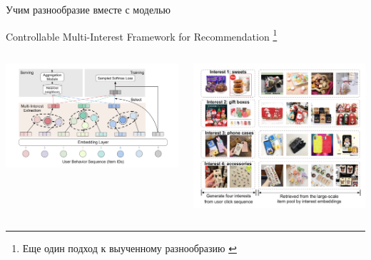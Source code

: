 \documentclass[11pt,aspectratio=169,handout]{beamer}
\begin{document}
\begin{frame}{Учим разнообразие вместе с моделью}

\begin{center}
Controllable Multi-Interest Framework for Recommendation \cite{ALIBABA}\footnote{Еще один подход к выученному разнообразию \cite{GENERATIVE}}
\end{center}

\begin{columns}
\begin{column}{0.45\textwidth}
\begin{center}
\includegraphics[scale=0.3]{images/alibaba.png}
\end{center}
\end{column}

\begin{column}{0.45\textwidth} 
\begin{center}
\includegraphics[scale=0.2]{images/divres.png}
\end{center}
\end{column}
\end{columns}

\end{frame}
\end{document}
